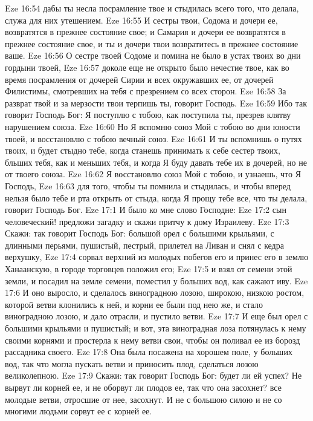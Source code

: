 \vs Eze 16:54 дабы ты несла посрамление твое и стыдилась всего того, что делала, служа для них утешением.
\vs Eze 16:55 И сестры твои, Содома и дочери ее, возвратятся в прежнее состояние свое; и Самария и дочери ее возвратятся в прежнее состояние свое, и ты и дочери твои возвратитесь в прежнее состояние ваше.
\vs Eze 16:56 О сестре твоей Содоме и помина не было в устах твоих во дни гордыни твоей,
\vs Eze 16:57 доколе еще не открыто было нечестие твое, как во время посрамления от дочерей Сирии и всех окружавших ее, от дочерей Филистимы, смотревших на тебя с презрением со всех сторон.
\vs Eze 16:58 За разврат твой и за мерзости твои терпишь ты, говорит Господь.
\vs Eze 16:59 Ибо так говорит Господь Бог: Я поступлю с тобою, как поступила ты, презрев клятву нарушением союза.
\vs Eze 16:60 Но Я вспомню союз Мой с тобою во дни юности твоей, и восстановлю с тобою вечный союз.
\vs Eze 16:61 И ты вспомнишь о путях твоих, и будет стыдно тебе, когда станешь принимать к себе сестер твоих, бльших тебя, как и меньших тебя, и когда Я буду давать тебе их в дочерей, но не от твоего союза.
\vs Eze 16:62 Я восстановлю союз Мой с тобою, и узнаешь, что Я Господь,
\vs Eze 16:63 для того, чтобы ты помнила и стыдилась, и чтобы вперед нельзя было тебе и рта открыть от стыда, когда Я прощу тебе все, что ты делала, говорит Господь Бог.
\vs Eze 17:1 И было ко мне слово Господне:
\vs Eze 17:2 сын человеческий! предложи загадку и скажи притчу к дому Израилеву.
\vs Eze 17:3 Скажи: так говорит Господь Бог: большой орел с большими крыльями, с длинными перьями, пушистый, пестрый, прилетел на Ливан и снял с кедра верхушку,
\vs Eze 17:4 сорвал верхний из молодых побегов его и принес его в землю Ханаанскую, в городе торговцев положил его;
\vs Eze 17:5 и взял от семени этой земли, и посадил на земле семени, поместил у больших вод, как сажают иву.
\vs Eze 17:6 И оно выросло, и сделалось виноградною лозою, широкою, низкою ростом, которой ветви клонились к ней, и корни ее были под нею же, и стало виноградною лозою, и дало отрасли, и пустило ветви.
\vs Eze 17:7 И еще был орел с большими крыльями и пушистый; и вот, эта виноградная лоза потянулась к нему своими корнями и простерла к нему ветви свои, чтобы он поливал ее из борозд рассадника своего.
\vs Eze 17:8 Она была посажена на хорошем поле, у больших вод, так что могла пускать ветви и приносить плод, сделаться лозою великолепною.
\vs Eze 17:9 Скажи: так говорит Господь Бог: будет ли ей успех? Не вырвут ли корней ее, и не оборвут ли плодов ее, так что она засохнет? все молодые ветви, отросшие от нее, засохнут. И не с большою силою и не со многими людьми сорвут ее с корней ее.
